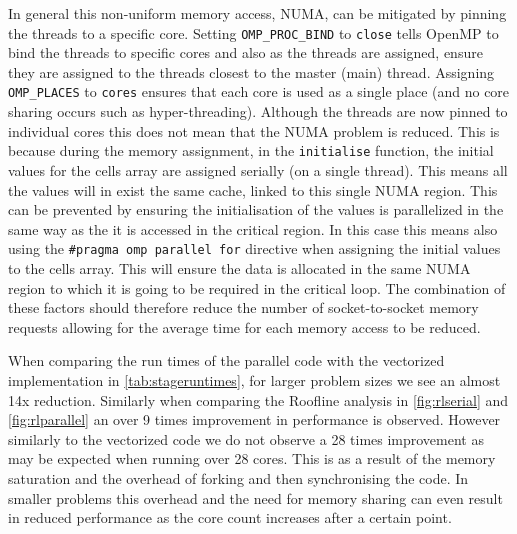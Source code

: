 \documentclass{article}
\begin{document}
\begin{multicols}{2}
In general this non-uniform memory access, NUMA, can be mitigated by pinning 
the threads to a specific core. Setting \verb|OMP_PROC_BIND| to \verb|close|
tells OpenMP to bind the threads to specific cores and also as the threads are
assigned, ensure they are assigned to the threads closest to the master (main)
thread. Assigning \verb|OMP_PLACES| to \verb|cores| ensures that each
core is used as a single place (and no core sharing occurs such as
hyper-threading). Although the threads are now pinned to individual cores this
does not mean that the NUMA problem is reduced. This is because during the
memory assignment, in the \verb|initialise| function, the initial values for the
cells array are assigned serially (on a single thread). This means all the
values will in exist the same cache, linked to this single NUMA region. This
can be prevented by ensuring the initialisation of the values is parallelized
in the same way as the it is accessed in the critical region. In this case this
means also using the \verb|#pragma omp parallel for| directive when assigning the initial
values to the cells array. This will ensure the data is allocated in the same
NUMA region to which it is going to be required in the critical loop. The
combination of these factors should therefore reduce the number of
socket-to-socket memory requests allowing for the average time for each memory
access to be reduced.  

When comparing the run times of the parallel code with the vectorized
implementation in \autoref{tab:stageruntimes}, for larger problem sizes we see
an almost 14x reduction. Similarly when comparing the Roofline analysis in
\autoref{fig:rlserial} and \autoref{fig:rlparallel} an over 9 times improvement
in performance is observed. However similarly to the vectorized code we do not
observe a 28 times improvement as may be expected when running over 28 cores.
This is as a result of the memory saturation and the overhead of forking and
then synchronising the code. In smaller problems this overhead and the need for
memory sharing can even result in reduced performance as the core count increases
after a certain point.



\end{multicols}
\end{document}
